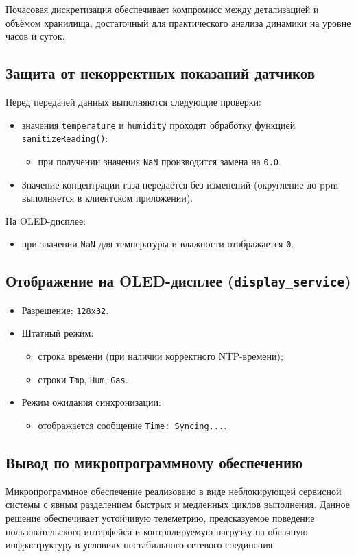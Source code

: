 Почасовая дискретизация обеспечивает компромисс между детализацией и объёмом хранилища, достаточный для практического анализа динамики на уровне часов и суток.

\subsection{Защита от некорректных показаний датчиков}

Перед передачей данных выполняются следующие проверки:

\begin{itemize}
    \item значения \texttt{temperature} и \texttt{humidity} проходят обработку функцией \texttt{sanitizeReading()}:
    \begin{itemize}
        \item при получении значения \texttt{NaN} производится замена на \texttt{0.0}.
    \end{itemize}
    \item Значение концентрации газа передаётся без изменений (округление до ppm выполняется в клиентском приложении).
\end{itemize}

На OLED-дисплее:

\begin{itemize}
    \item при значении \texttt{NaN} для температуры и влажности отображается \texttt{0}.
\end{itemize}

\subsection{Отображение на OLED-дисплее (\texttt{display\_service})}

\begin{itemize}
    \item Разрешение: \texttt{128x32}.
    \item Штатный режим:
    \begin{itemize}
        \item строка времени (при наличии корректного NTP-времени);
        \item строки \texttt{Tmp}, \texttt{Hum}, \texttt{Gas}.
    \end{itemize}
    \item Режим ожидания синхронизации:
    \begin{itemize}
        \item отображается сообщение \texttt{Time: Syncing...}.
    \end{itemize}
\end{itemize}

\subsection{Вывод по микропрограммному обеспечению}

Микропрограммное обеспечение реализовано в виде неблокирующей сервисной системы с явным разделением быстрых и медленных циклов выполнения. Данное решение обеспечивает устойчивую телеметрию, предсказуемое поведение пользовательского интерфейса и контролируемую нагрузку на облачную инфраструктуру в условиях нестабильного сетевого соединения.
